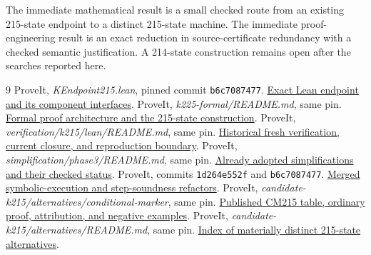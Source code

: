 \documentclass[11pt,letterpaper]{article}
\theoremstyle{definition}\newtheorem{definition}[theorem]{Definition}
\theoremstyle{remark}\newtheorem{remark}[theorem]{Remark}
\begin{document}
The immediate mathematical result is a small checked route from an existing
215-state endpoint to a distinct 215-state machine. The immediate
proof-engineering result is an exact reduction in source-certificate
redundancy with a checked semantic justification. A 214-state construction
remains open after the searches reported here.

\begin{thebibliography}{9}
 ProveIt, \emph{KEndpoint215.lean}, pinned commit
\texttt{b6c7087477}.\newline
\href{https://github.com/VladimirReshetnikov/ProveIt/blob/b6c7087477e51c017003bd729e712c8969733223/Computability/BusyBeaver/Lean/BusyBeaver/ZFC/KEndpoint215.lean}{Exact Lean endpoint and its component interfaces}.
 ProveIt, \emph{k225-formal/README.md}, same pin.\newline
\href{https://github.com/VladimirReshetnikov/ProveIt/blob/b6c7087477e51c017003bd729e712c8969733223/Computability/BusyBeaver/Research/ZFC/k225-formal/README.md}{Formal proof architecture and the 215-state construction}.
 ProveIt, \emph{verification/k215/lean/README.md}, same pin.\newline
\href{https://github.com/VladimirReshetnikov/ProveIt/blob/b6c7087477e51c017003bd729e712c8969733223/Computability/BusyBeaver/Research/ZFC/k225-formal/verification/k215/lean/README.md}{Historical fresh verification, current closure, and reproduction boundary}.
 ProveIt, \emph{simplification/phase3/README.md}, same pin.\newline
\href{https://github.com/VladimirReshetnikov/ProveIt/blob/b6c7087477e51c017003bd729e712c8969733223/Computability/BusyBeaver/Research/ZFC/k225-formal/verification/k215/simplification/phase3/README.md}{Already adopted simplifications and their checked status}.
 ProveIt, commits \texttt{1d264e552f} and \texttt{b6c7087477}.\newline
\href{https://github.com/VladimirReshetnikov/ProveIt/commit/b6c7087477e51c017003bd729e712c8969733223}{Merged symbolic-execution and step-soundness refactors}.
 ProveIt, \emph{candidate-k215/alternatives/conditional-marker}, same pin.\newline
\href{https://github.com/VladimirReshetnikov/ProveIt/blob/b6c7087477e51c017003bd729e712c8969733223/Computability/BusyBeaver/Research/ZFC/candidate-k215/alternatives/conditional-marker/README.md}{Published CM215 table, ordinary proof, attribution, and negative examples}.
 ProveIt, \emph{candidate-k215/alternatives/README.md}, same pin.\newline
\href{https://github.com/VladimirReshetnikov/ProveIt/blob/b6c7087477e51c017003bd729e712c8969733223/Computability/BusyBeaver/Research/ZFC/candidate-k215/alternatives/README.md}{Index of materially distinct 215-state alternatives}.
\end{thebibliography}
\end{document}
